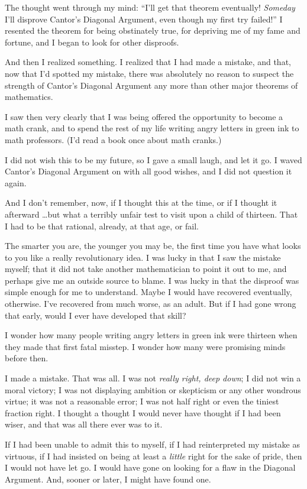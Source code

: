{
 The thought went through my mind:
``I'll get that theorem eventually!
\textit{Someday} I'll disprove Cantor's
Diagonal Argument, even though my first try failed!''
I resented the theorem for being obstinately true, for depriving me of
my fame and fortune, and I began to look for other disproofs.}

{
 And then I realized something. I realized that I had made a
mistake, and that, now that I'd spotted my mistake,
there was absolutely no reason to suspect the strength of
Cantor's Diagonal Argument any more than other major
theorems of mathematics.}

{
 I saw then very clearly that I was being offered the opportunity
to become a math crank, and to spend the rest of my life writing angry
letters in green ink to math professors. (I'd read a
book once about math cranks.)}

{
 I did not wish this to be my future, so I gave a small laugh, and
let it go. I waved Cantor's Diagonal Argument on with
all good wishes, and I did not question it again.}

{
 And I don't remember, now, if I thought this at
the time, or if I thought it afterward \ldots but what a terribly unfair
test to visit upon a child of thirteen. That I had to be that rational,
already, at that age, or fail.}

{
 The smarter you are, the younger you may be, the first time you
have what looks to you like a really revolutionary idea. I was lucky in
that I saw the mistake myself; that it did not take another
mathematician to point it out to me, and perhaps give me an outside
source to blame. I was lucky in that the disproof was simple enough for
me to understand. Maybe I would have recovered eventually, otherwise.
I've recovered from much worse, as an adult. But if I
had gone wrong that early, would I ever have developed that skill?}

{
 I wonder how many people writing angry letters in green ink were
thirteen when they made that first fatal misstep. I wonder how many
were promising minds before then.}

{
 I made a mistake. That was all. I was not \textit{really right,
deep down}; I did not win a moral victory; I was not displaying
ambition or skepticism or any other wondrous virtue; it was not a
reasonable error; I was not half right or even the tiniest fraction
right. I thought a thought I would never have thought if I had been
wiser, and that was all there ever was to it.}

{
 If I had been unable to admit this to myself, if I had
reinterpreted my mistake as virtuous, if I had insisted on being at
least a \textit{little} right for the sake of pride, then I would not
have let go. I would have gone on looking for a flaw in the Diagonal
Argument. And, sooner or later, I might have found one.}

